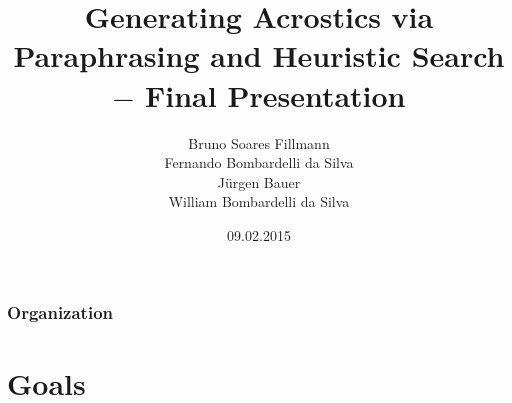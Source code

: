 \documentclass{beamer}
\title[Generating Acrostics via Paraphrasing and Heuristic Search]{Generating Acrostics via Paraphrasing and Heuristic Search $-$ Final Presentation} %
\author[Bruno, Fernando, Jürgen, William]{Bruno Soares Fillmann\\
Fernando Bombardelli da Silva\\
Jürgen Bauer\\
William Bombardelli da Silva
} %
\institute[TU Berlin] %
{
Technische Universität Berlin \\ %
Datenbanksysteme und Informationsmanagement \\
DBPRO – Database Projects (WS 2014/2015) \\
\medskip
}
\date{09.02.2015} %
\begin{document}
\begin{frame}
\titlepage %
\end{frame}

\begin{frame}
\frametitle{Organization} %
\tableofcontents %
\end{frame}


\section{Goals} %
\end{document}
